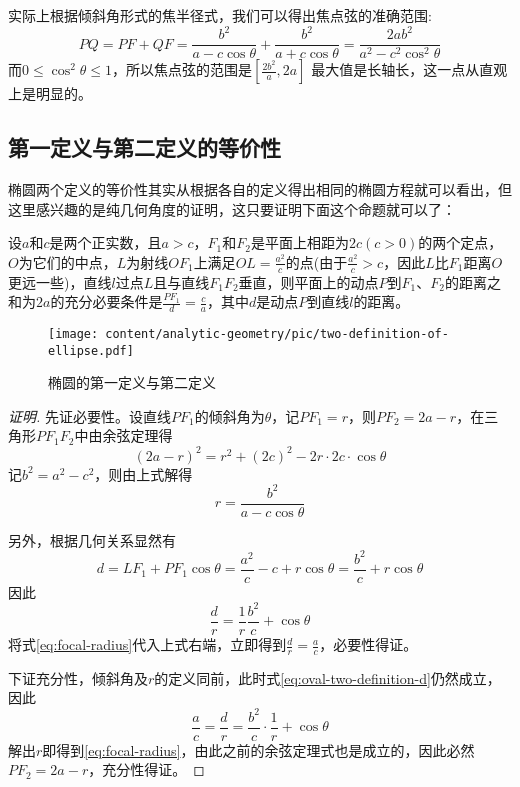 实际上根据倾斜角形式的焦半径式，我们可以得出焦点弦的准确范围:
\begin{equation*}
  PQ=PF+QF=\frac{b^2}{a-c\cos{\theta}}+\frac{b^2}{a+c\cos{\theta}}=\frac{2ab^2}{a^2-c^2\cos^2{\theta}}
\end{equation*}
而$0 \leqslant \cos^2{\theta} \leqslant 1$，所以焦点弦的范围是$[\frac{2b^2}{a}, 2a]$
最大值是长轴长，这一点从直观上是明显的。

\subsection{第一定义与第二定义的等价性}
\label{sec:the-equalance-for-two-definition-of-oval}

椭圆两个定义的等价性其实从根据各自的定义得出相同的椭圆方程就可以看出，但这里感兴趣的是纯几何角度的证明，这只要证明下面这个命题就可以了：
\begin{statement}
设$a$和$c$是两个正实数，且$a>c$，$F_1$和$F_2$是平面上相距为$2c(c>0)$的两个定点，$O$为它们的中点，$L$为射线$OF_1$上满足$OL=\frac{a^2}{c}$的点(由于$\frac{a^2}{c}>c$，因此$L$比$F_1$距离$O$更远一些)，直线$l$过点$L$且与直线$F_1F_2$垂直，则平面上的动点$P$到$F_1$、$F_2$的距离之和为$2a$的充分必要条件是$\frac{PF_1}{d}=\frac{c}{a}$，其中$d$是动点$P$到直线$l$的距离。
\end{statement}

\begin{figure}[htbp]
  \centering
\texttt{[image: content/analytic-geometry/pic/two-definition-of-ellipse.pdf]}
\caption{椭圆的第一定义与第二定义}
\label{fig:two-definition-of-ellipse}
\end{figure}

\begin{proof}[证明]
 先证必要性。设直线$PF_1$的倾斜角为$\theta$，记$PF_1=r$，则$PF_2=2a-r$，在三角形$PF_1F_2$中由余弦定理得
\[ (2a-r)^2=r^2+(2c)^2-2r \cdot 2c \cdot \cos{\theta} \]
记$b^2=a^2-c^2$，则由上式解得
\begin{equation}
\label{eq:focal-radius}
r=\frac{b^2}{a-c\cos{\theta}}
\end{equation}

另外，根据几何关系显然有
\begin{equation}
  \label{eq:oval-two-definition-d}
 d=LF_1+PF_1\cos{\theta}=\frac{a^2}{c}-c+r\cos{\theta}=\frac{b^2}{c}+r\cos{\theta} 
\end{equation}
因此
\[ \frac{d}{r}=\frac{1}{r}\frac{b^2}{c}+\cos{\theta} \] 
将式\ref{eq:focal-radius}代入上式右端，立即得到$\frac{d}{r}=\frac{a}{c}$，必要性得证。

下证充分性，倾斜角及$r$的定义同前，此时式\ref{eq:oval-two-definition-d}仍然成立，因此
\[ \frac{a}{c}=\frac{d}{r}=\frac{b^2}{c} \cdot \frac{1}{r}+\cos{\theta} \]
解出$r$即得到\ref{eq:focal-radius}，由此之前的余弦定理式也是成立的，因此必然$PF_2=2a-r$，充分性得证。
\end{proof}

